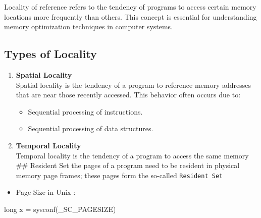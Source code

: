 \documentclass[
]{article}
\newenvironment{Shaded}{}{}
\newcommand{\DataTypeTok}[1]{\textcolor[rgb]{0.56,0.13,0.00}{#1}}
\newcommand{\NormalTok}[1]{#1}
\newcommand{\OperatorTok}[1]{\textcolor[rgb]{0.40,0.40,0.40}{#1}}
\providecommand{\tightlist}{%
  \setlength{\itemsep}{0pt}\setlength{\parskip}{0pt}}
\begin{document}
Locality of reference refers to the tendency of programs to access
certain memory locations more frequently than others. This concept is
essential for understanding memory optimization techniques in computer
systems.

\hypertarget{types-of-locality}{%
\subsection{Types of Locality}\label{types-of-locality}}

\begin{enumerate}
\def\labelenumi{\arabic{enumi}.}
\tightlist
\item
  \textbf{Spatial Locality}\\
  Spatial locality is the tendency of a program to reference memory
  addresses that are near those recently accessed. This behavior often
  occurs due to:

  \begin{itemize}
  \tightlist
  \item
    Sequential processing of instructions.
  \item
    Sequential processing of data structures.
  \end{itemize}
\item
  \textbf{Temporal Locality}\\
  Temporal locality is the tendency of a program to access the same
  memory \#\# Resident Set the pages of a program need to be resident in
  physical memory page frames; these pages form the so-called
  \texttt{Resident\ Set}
\end{enumerate}

\begin{itemize}
\tightlist
\item
  Page Size in Unix :
\end{itemize}

\begin{Shaded}
\begin{Highlighting}[]
\DataTypeTok{long}\NormalTok{ x }\OperatorTok{=}\NormalTok{ sysconf}\OperatorTok{(}\NormalTok{\_SC\_PAGESIZE}\OperatorTok{)}
\end{Highlighting}
\end{Shaded}
\end{document}
